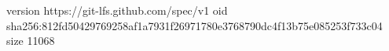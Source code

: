 version https://git-lfs.github.com/spec/v1
oid sha256:812fd50429769258af1a7931f26971780e3768790dc4f13b75e085253f733c04
size 11068
